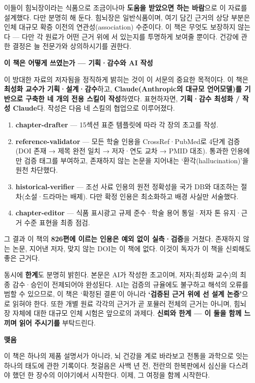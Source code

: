 \documentclass[11pt]{article}
\newcommand{\gothic}{\sffamily}
\newcommand{\pfsec}[1]{%
  \par\vspace{2.4mm}%
  {\gothic\large\bfseries\color{celadondk}#1}\par\vspace{-0.4mm}}
\begin{document}
이들이 힘뇌장이라는 식품으로 조금이나마 \textbf{도움을 받았으면 하는 바람}으로 이 자료를 설계했다. 다만 분명히 해 둔다. 힘뇌장은 일반식품이며, 여기 담긴 근거의 상당 부분은 인체 대규모 확증 이전의 연관성(association) 수준이다. 이 책은 무엇도 보장하지 않는다 — 다만 각 원료가 어떤 근거 위에 서 있는지를 투명하게 보여줄 뿐이다. 건강에 관한 결정은 늘 전문가와 상의하시기를 권한다.

\pfsec{이 책은 어떻게 쓰였는가 — 기획·감수와 AI 작성}
이 방대한 자료의 저자됨을 정직하게 밝히는 것이 이 서문의 중요한 목적이다. 이 책은 \textbf{최성화 교수가 기획·설계·감수}하고, \textbf{Claude(Anthropic의 대규모 언어모델)를 기반으로 구축한 네 개의 전용 스킬이 작성}하였다. 표현하자면, \textbf{기획·감수 최성화 / 작성 Claude}다. 작성은 다음 네 스킬의 협업으로 이루어졌다.

\begin{enumerate}[leftmargin=6mm,itemsep=1mm,topsep=1mm]
  \item \textbf{chapter-drafter} — 15섹션 표준 템플릿에 따라 각 장의 초고를 작성.
  \item \textbf{reference-validator} — 모든 학술 인용을 CrossRef·PubMed로 4단계 검증(DOI 존재 → 제목 완전 일치 → 저자·연도 교차 → PMID 대조). 통과한 인용에만 검증 태그를 부여하고, 존재하지 않는 논문을 지어내는 ‘환각(hallucination)’을 원천 차단했다.
  \item \textbf{historical-verifier} — 조선 사료 인용의 원전 정확성을 국가 DB와 대조하는 절차(소설·드라마는 배제). 다만 확정 인용은 최소화하고 배경 사실만 서술했다.
  \item \textbf{chapter-editor} — 식품 표시광고 규제 준수·학술 용어 통일·저자 톤 유지·근거 수준 표현을 최종 점검.
\end{enumerate}

그 결과 이 책의 \textbf{826편에 이르는 인용은 예외 없이 실측·검증}을 거쳤다. 존재하지 않는 논문, 지어낸 저자, 맞지 않는 DOI는 이 책에 없다. 이것이 독자가 이 책을 신뢰해도 좋은 근거다.

동시에 \textbf{한계}도 분명히 밝힌다. 본문은 AI가 작성한 초고이며, 저자(최성화 교수)의 최종 감수·승인이 전제되어야 완성된다. AI는 검증의 규율에도 불구하고 해석의 오류를 범할 수 있으므로, 이 책은 ‘확정된 결론’이 아니라 \textbf{‘검증된 근거 위에 선 설계 논증’}으로 읽혀야 한다. 또한 개별 원료 각각의 근거가 곧 포뮬러 전체의 근거는 아니며, 힘뇌장 자체에 대한 대규모 인체 시험은 앞으로의 과제다. \textbf{신뢰와 한계 — 이 둘을 함께 느끼며 읽어 주시기를} 부탁드린다.

\pfsec{맺음}
이 책은 하나의 제품 설명서가 아니라, 뇌 건강을 계로 바라보고 전통을 과학으로 잇는 하나의 태도에 관한 기록이다. 첫걸음은 사백 년 전, 전란의 한복판에서 심신을 다스려야 했던 한 장수의 이야기에서 시작한다. 이제, 그 여정을 함께 시작한다.
\end{document}
